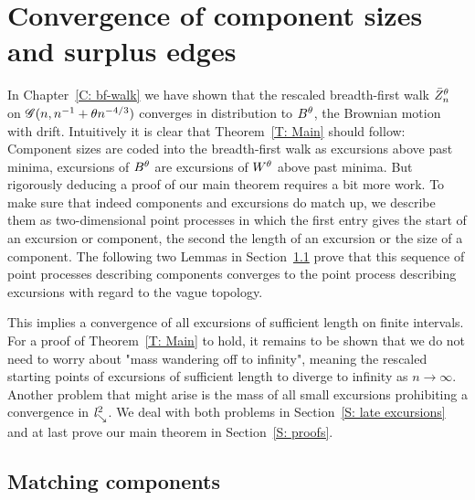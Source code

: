 
\chapter{Convergence of component sizes and surplus edges} \label{C: convergence}


In Chapter~\ref{C: bf-walk} we have shown that the rescaled breadth-first walk $\bar{Z}^{\theta}_n$ on $\mathscr{G}(n, n^{-1} + \theta n^{-4/3})$
converges in distribution to $B^{\theta}$, the Brownian motion with drift.
Intuitively it is clear that Theorem~\ref{T: Main} should follow:
Component sizes are coded into the breadth-first walk as excursions above past minima,
excursions of $B^{\theta}$ are excursions of $W^{\theta}$ above past minima.
But rigorously deducing a proof of our main theorem requires a bit more work.
To make sure that indeed components and excursions do match up,
we describe them as two-dimensional point processes
in which the first entry gives the start of an excursion or component, 
the second the length of an excursion or the size of a component.
The following two Lemmas in Section~\ref{S: matching components} prove that this sequence of point processes describing components 
converges to the point process describing excursions with regard to the vague topology.

This implies a convergence of all excursions of sufficient length on finite intervals.
For a proof of Theorem~\ref{T: Main} to hold, it remains to be shown that we do not need to worry about "mass wandering off to infinity",
meaning the rescaled starting points of excursions of sufficient length to diverge to infinity as $n \rightarrow \infty$.
Another problem that might arise is the mass of all small excursions prohibiting a convergence in $\mathit{l}^2_{\searrow}$.
We deal with both problems in Section~\ref{S: late excursions} and at last prove our main theorem in Section~\ref{S: proofs}.


\section{Matching components} \label{S: matching components}

